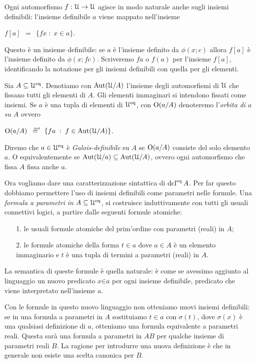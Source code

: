 Ogni automorfismo $f:\EuScript U\rightarrow\EuScript U$ agisce in modo naturale anche sugli insiemi definibili: l'insieme definibile $a$ viene mappato nell'insieme

\hfil$f[a]\ \ =\ \ \big\{fx\;:\;x\in a\big\}$.

Questo \`e un insieme definibile: se $a$ \`e l'insieme definito da $\phi(x;c)$ allora $f[a]$ \`e l'insieme definito da $\phi(x;fc)$. Scriveremo  $fa$ o $f(a)$ per l'insieme $f[a]$, identificando la notazione per gli insiemi definibili con quella per gli elementi.

Sia $A\subseteq\EuScript U^{\rm eq}$. Denotiamo con \emph{$\textrm{Aut}(\EuScript U/A)$\/} l'insieme degli automorfismi di $\EuScript U$ che fissano tutti gli elementi di $A$. Gli elementi immaginari si intendono fissati come insiemi. Se $a$ \`e una tupla di elementi di $\EuScript U^{\rm eq}$, con \emph{$\textrm{O}(a/A)$\/} denoteremo l'\emph{orbita di $a$ su $A$\/} ovvero

\hfil\emph{$\textrm{O}(a/A)$}$\ \ \deq\ \ \{fa\;:\; f\in\Aut(\U/A)\}$.

Diremo che $a\in\EuScript U^{\rm eq}$ \`e \emph{Galois-definibile\/} su $A$ se $\textrm{O}(a/A)$ consiste del solo elemento $a$. O equivalentemente se $\textrm{Aut}(\EuScript U/a)\subseteq\textrm{Aut}(\EuScript U/A)$, ovvero ogni automorfismo che fissa $A$ fissa anche $a$.

Ora vogliamo dare una caratterizzazione sintattica di $\mathop{\rm dcl}^{\rm eq} A$. Per far questo dobbiamo permettere l'uso di insiemi definibili come parametri nelle formule. Una \emph{formula a parametri in $A\subseteq\EuScript U^{\rm eq}$}, si costruisce induttivamente con tutti gli usuali connettivi logici, a partire dalle seguenti formule atomiche:

\begin{itemize}
\item[1.] le usuali formule atomiche del prim'ordine con parametri (reali) in $A$;
\item[2.] le formule atomiche della forma $t\in a$ dove $a\in A$ \`e un elemento immaginario e $t$ \`e una tupla di termini a parametri (reali) in $A$.
\end{itemize}

La semantica di queste formule \`e quella naturale: \`e come se avessimo aggiunto al linguaggio un nuovo predicato $x\mathord\in a$ per ogni insieme definibile, predicato che viene interpretato nell'insieme $a$. 

Con le formule in questo nuovo linguaggio non otteniamo nuovi insiemi definibili: se in una formula a parametri in $A$ sostituiamo $t\in a$ con $\sigma(t)$, dove $\sigma(x)$ \`e una qualsiasi definizione di $a$, otteniamo una formula equivalente a parametri reali. Questa sar\`a una formula a parametri in $AB$ per qualche insieme di parametri reali $B$. La ragione per introdurre una nuova definizione \`e che in generale non esiste una scelta canonica per $B$.

